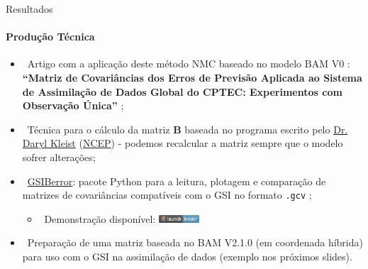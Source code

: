 \documentclass[10pt,aspectratio=169]{beamer}
\begin{document}
\begin{frame}{Resultados}
\framesubtitle{Produção Técnica~\faCogs}
    \begin{itemize}
        \item {}~Artigo com a aplicação deste método NMC baseado no modelo BAM V0 \cite{figueroaetal/2016}: \textbf{``Matriz de Covariâncias dos Erros de Previsão Aplicada ao Sistema de Assimilação de Dados Global do CPTEC: Experimentos com Observação Única''} \cite{bastarz/2017};
        \pause
        \item \faCode~Técnica para o cálculo da matriz $\mathbf{B}$ baseada no programa escrito pelo \href{https://community.wmo.int/contacts/dr-daryl-t-kleist}{Dr. Daryl Kleist} (\href{https://www.weather.gov/ncep/}{NCEP}) - podemos recalcular a matriz sempre que o modelo sofrer alterações;
        \pause
        \item \faCode~\href{https://github.com/GAD-DIMNT-CPTEC/GSIBerror}{GSIBerror}: pacote Python para a leitura, plotagem e comparação de matrizes de covariâncias compatíveis com o GSI no formato \texttt{.gcv} \cite{bastarz/2022};
        \pause
        \begin{itemize}
        	\item \faPython~Demonstração disponível: \href{https://mybinder.org/v2/gh/cfbastarz/GSIBerror/main}{\includegraphics[width=1.5cm]{binder.png}}
        \end{itemize}
        \pause
        \item \faFlask~Preparação de uma matriz baseada no BAM V2.1.0 (em coordenada híbrida) para uso com o GSI na assimilação de dados (exemplo nos próximos slides).
    \end{itemize}
\end{frame}
\end{document}
